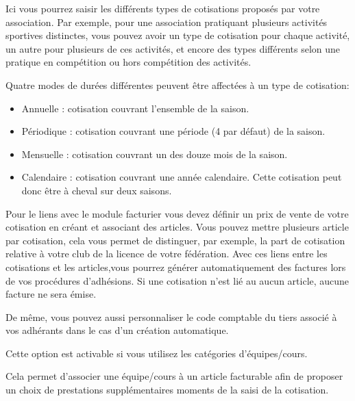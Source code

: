 \documentclass[a4paper,10pt,oneside,french]{sphinxmanual}
\begin{document}
\begin{quote}

\noindent{}
\end{quote}

Ici vous pourrez saisir les différents types de cotisations proposés par votre association. Par exemple, pour une association pratiquant plusieurs activités sportives distinctes, vous pouvez avoir un type de cotisation pour chaque activité, un autre pour plusieurs de ces activités, et encore des types différents selon une pratique en compétition ou hors compétition des activités.

Quatre modes de durées différentes peuvent être affectées à un type de cotisation:
\begin{itemize}
\item {} 
Annuelle : cotisation couvrant l’ensemble de la saison.

\item {} 
Périodique : cotisation couvrant une période (4 par défaut) de la saison.

\item {} 
Mensuelle : cotisation couvrant un des douze mois de la saison.

\item {} 
Calendaire : cotisation couvrant une année calendaire. Cette cotisation peut donc être à cheval sur deux saisons.

\end{itemize}

Pour le liens avec le module facturier vous devez définir un prix de vente de votre cotisation en créant et associant des articles.
Vous pouvez mettre plusieurs article par cotisation, cela vous permet de distinguer, par exemple, la part de cotisation relative à votre club de la licence de votre fédération.
Avec ces liens entre les cotisations et les articles,vous pourrez générer automatiquement des factures lors de vos procédures d’adhésions. Si une cotisation n’est lié au aucun article, aucune facture ne sera émise.

De même, vous pouvez aussi personnaliser le code comptable du tiers associé à vos adhérants dans le cas d’un création automatique.


Cette option est activable si vous utilisez les catégories d’équipes/cours.

Cela permet d’associer une équipe/cours à un article facturable afin de proposer un choix de prestations supplémentaires moments de la saisi de la cotisation.
\end{document}
